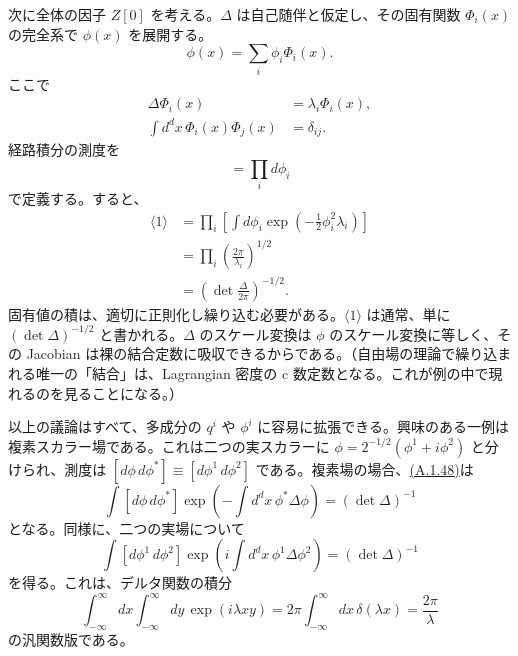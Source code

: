 次に全体の因子 $Z[0]$ を考える。$\Delta$ は自己随伴と仮定し、その固有関数 $\Phi_i(x)$ の完全系で $\phi(x)$ を展開する。
\begin{equation}
\phi(x)=\sum_i\phi_i\Phi_i(x).
\tag{A.1.45}\label{eq:A.1.45}
\end{equation}
ここで
\begin{align}
\Delta\Phi_i(x)&=\lambda_i\Phi_i(x),
\tag{A.1.46a}\label{eq:A.1.46a}\\
\int d^dx\,\Phi_i(x)\Phi_j(x)&=\delta_{ij}.
\tag{A.1.46b}\label{eq:A.1.46b}
\end{align}
経路積分の測度を
\begin{equation}
[d\phi]=\prod_i d\phi_i
\tag{A.1.47}\label{eq:A.1.47}
\end{equation}
で定義する。すると、
\begin{equation}
\begin{aligned}
\langle1\rangle
&=\prod_i\left[\int d\phi_i\exp\left(-\frac12\phi_i^2\lambda_i\right)\right]\\
&=\prod_i\left(\frac{2\pi}{\lambda_i}\right)^{1/2}\\
&=\left(\det\frac{\Delta}{2\pi}\right)^{-1/2}.
\end{aligned}
\tag{A.1.48}\label{eq:A.1.48}
\end{equation}
固有値の積は、適切に正則化し繰り込む必要がある。$\langle1\rangle$ は通常、単に $(\det\Delta)^{-1/2}$ と書かれる。$\Delta$ のスケール変換は $\phi$ のスケール変換に等しく、その Jacobian は裸の結合定数に吸収できるからである。（自由場の理論で繰り込まれる唯一の「結合」は、Lagrangian 密度の c 数定数となる。これが例の中で現れるのを見ることになる。）

以上の議論はすべて、多成分の $q^i$ や $\phi^i$ に容易に拡張できる。興味のある一例は複素スカラー場である。これは二つの実スカラーに $\phi=2^{-1/2}(\phi^1+i\phi^2)$ と分けられ、測度は $[d\phi\,d\phi^*]\equiv[d\phi^1\,d\phi^2]$ である。複素場の場合、\hyperref[eq:A.1.48]{(A.1.48)}は
\begin{equation}
\int[d\phi\,d\phi^*]\exp\left(-\int d^dx\,\phi^*\Delta\phi\right)
=(\det\Delta)^{-1}
\tag{A.1.49}\label{eq:A.1.49}
\end{equation}
となる。同様に、二つの実場について
\begin{equation}
\int[d\phi^1\,d\phi^2]\exp\left(i\int d^dx\,\phi^1\Delta\phi^2\right)
=(\det\Delta)^{-1}
\tag{A.1.50}\label{eq:A.1.50}
\end{equation}
を得る。これは、デルタ関数の積分
\begin{equation}
\int_{-\infty}^{\infty}dx\int_{-\infty}^{\infty}dy\,\exp(i\lambda xy)
=2\pi\int_{-\infty}^{\infty}dx\,\delta(\lambda x)
=\frac{2\pi}{\lambda}
\tag{A.1.51}\label{eq:A.1.51}
\end{equation}
の汎関数版である。

